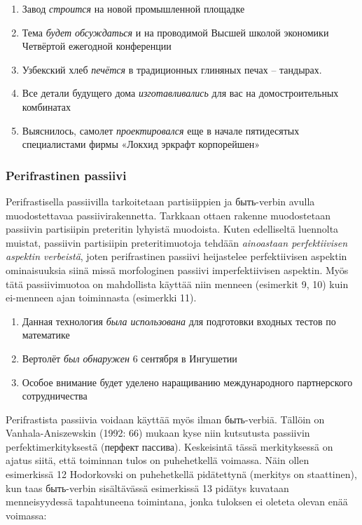 \documentclass[]{scrartcl}
\providecommand{\tightlist}{%
  \setlength{\itemsep}{0pt}\setlength{\parskip}{0pt}}
\begin{document}
\begin{enumerate}
\def\labelenumi{(\arabic{enumi})}
\setcounter{enumi}{3}
\tightlist
\item
  Завод \emph{строится} на новой промышленной площадке
\item
  Тема \emph{будет обсуждаться} и на проводимой Высшей школой экономики
  Четвёртой ежегодной конференции
\item
  Узбекский хлеб \emph{печётся} в традиционных глиняных печах --
  тандырах.
\item
  Все детали будущего дома \emph{изготавливались} для вас на
  домостроительных комбинатах
\item
  Выяснилось, самолет \emph{проектировался} еще в начале пятидесятых
  специалистами фирмы «Локхид эркрафт корпорейшен»
\end{enumerate}

\subsubsection{Perifrastinen passiivi}\label{perifrastinen-passiivi}

Perifrastisella passiivilla tarkoitetaan partisiippien ja быть-verbin
avulla muodostettavaa passiivirakennetta. Tarkkaan ottaen rakenne
muodostetaan passiivin partisiipin preteritin lyhyistä muodoista. Kuten
edelliseltä luennolta muistat, passiivin partisiipin preteritimuotoja
tehdään \emph{ainoastaan perfektiivisen aspektin verbeistä}, joten
perifrastinen passiivi heijastelee perfektiivisen aspektin ominaisuuksia
siinä missä morfologinen passiivi imperfektiivisen aspektin. Myös tätä
passiivimuotoa on mahdollista käyttää niin menneen (esimerkit 9, 10)
kuin ei-menneen ajan toiminnasta (esimerkki 11).

\begin{enumerate}
\def\labelenumi{(\arabic{enumi})}
\setcounter{enumi}{8}
\tightlist
\item
  Данная технология \emph{была использована} для подготовки входных
  тестов по математике
\item
  Вертолёт \emph{был обнаружен} 6 сентября в Ингушетии
\item
  Особое внимание будет уделено наращиванию международного партнерского
  сотрудничества
\end{enumerate}

Perifrastista passiivia voidaan käyttää myös ilman быть-verbiä. Tällöin
on Vanhala-Aniszewskin (1992: 66) mukaan kyse niin kutsutusta passiivin
perfektimerkityksestä (перфект пассива). Keskeisintä tässä merkityksessä
on ajatus siitä, että toiminnan tulos on puhehetkellä voimassa. Näin
ollen esimerkissä 12 Hodorkovski on puhehetkellä pidätettynä (merkitys
on staattinen), kun taas быть-verbin sisältävässä esimerkissä 13 pidätys
kuvataan menneisyydessä tapahtuneena toimintana, jonka tuloksen ei
oleteta olevan enää voimassa:
\end{document}
